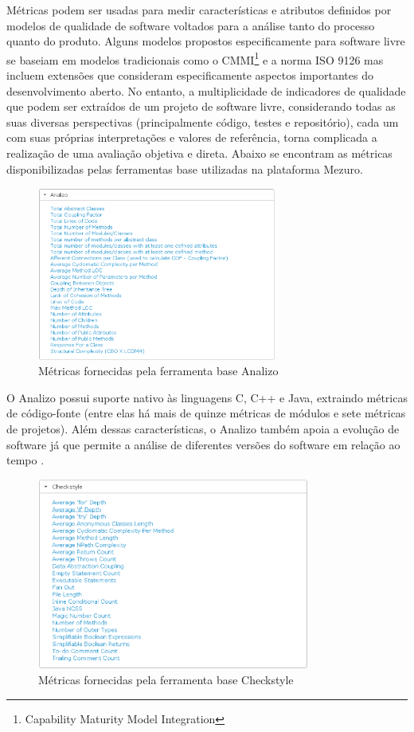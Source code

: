 Métricas podem ser usadas para medir características e atributos definidos por modelos de qualidade de software voltados para a análise tanto do processo quanto do produto. Alguns modelos propostos especificamente para software livre se baseiam em modelos tradicionais como o CMMI\footnote{Capability Maturity Model Integration}\cite{paulk1994capability} e a norma ISO 9126\cite{iso2003iec} mas incluem extensões que consideram especificamente aspectos importantes do desenvolvimento aberto. No entanto, a multiplicidade de indicadores de qualidade que podem ser extraídos de um projeto de software livre, considerando todas as suas diversas perspectivas (principalmente código, testes e repositório), cada um com suas próprias interpretações e valores de referência, torna complicada a realização de uma avaliação objetiva e direta. Abaixo se encontram as métricas disponibilizadas pelas ferramentas base utilizadas na plataforma Mezuro.

\graphicspath{{figuras/}}
\begin{figure}[H]
\centering
\includegraphics[width=0.7\textwidth]{analizo_bt}
\caption{Métricas fornecidas pela ferramenta base Analizo}
\label{fig-analizo_bt}
\end{figure}

O Analizo possui suporte nativo às linguagens C, C++ e Java, extraindo métricas de código-fonte (entre elas há mais de quinze métricas de módulos e sete métricas de projetos). Além dessas características, o Analizo também apoia a evolução de software já que permite a análise de diferentes versões do software em relação ao tempo .

\graphicspath{{figuras/}}
\begin{figure}[htpb]
\centering
\includegraphics[width=0.8\textwidth]{checkstyle_bt}
\caption{Métricas fornecidas pela ferramenta base Checkstyle}
\label{fig-checkstyle_bt}
\end{figure}

